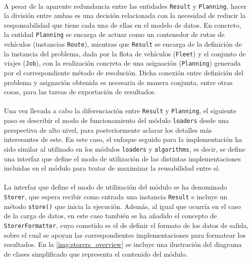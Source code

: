 \documentclass{subfiles}
\begin{document}
          \paragraph{}
          A pesar de la aparente redundancia entre las entidades \texttt{Result} y \texttt{Planning}, hacer la división entre ambas es una decisión relacionada con la necesidad de reducir la responsabilidad que tiene cada una de ellas en el modelo de datos. En concreto, la entidad \texttt{Planning} se encarga de actuar como un contenedor de rutas de vehículos (instancias \texttt{Route}), mientras que \texttt{Result} se encarga de  la definición de la instancia del problema, dada por la flota de vehículos (\texttt{Fleet}) y el conjunto de viajes (\texttt{Job}), con la realización concreta de una asignación (\texttt{Planning}) generada por el correspondiente método de resolución. Dicha conexión entre definición del problema y asignación obtenida es necesaria de manera conjunta, entre otras cosas, para las tareas de exportación de resultados.
          
          \paragraph{}
          Una vez llevada a cabo la diferenciación entre \texttt{Result} y \texttt{Planning}, el siguiente paso es describir el modo de funcionamiento del módulo \texttt{loaders} desde una perspectiva de alto nivel, para posteriormente aclarar los detalles más interesantes de este. En este caso, el enfoque seguido para la implementación ha sido similar al utilizado en los módulos \texttt{loaders} y \texttt{algorithms}, es decir, se define una interfaz que define el modo de utilización de las distintas implementaciones incluidas en el módulo para tratar de maximizar la reusabilidad entre sí. 

          \paragraph{}
          La interfaz que define el modo de utilización del módulo se ha denominado \texttt{Storer}, que espera recibir como entrada una instancia \texttt{Result} e incluye un método \verb|store()| que inicia la ejecución. Además, al igual que ocurría en el caso de la carga de datos, en este caso también se ha añadido el concepto de \texttt{StorerFormatter}, cuyo cometido es el de definir el formato de los datos de salida, sobre el cual se apoyan las correspondientes implementaciones para formatear los resultados. En la \cref{img:storers_overview} se incluye una ilustración del diagrama de clases simplificado que representa el contenido del módulo.
\end{document}
